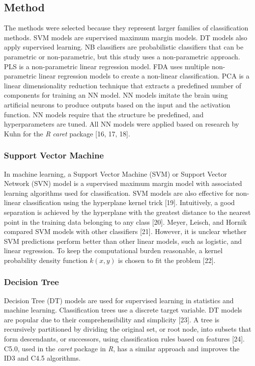 \let\LaTeXcline\cline\documentclass[sn-mathphys-num]{sn-jnl}\let\cline\LaTeXcline
\begin{document}
\subsection{Method}

The methods were selected because they represent larger families of classification methods. SVM models are supervised maximum margin models. DT models also apply supervised learning. NB classifiers are probabilistic classifiers that can be parametric or non-parametric, but this study uses a non-parametric approach. PLS is a non-parametric linear regression model. FDA uses multiple non-parametric linear regression models to create a non-linear classification. PCA is a linear dimensionality reduction technique that extracts a predefined number of components for training an NN model. NN models imitate the brain using artificial neurons to produce outputs based on the input and the activation function. NN models require that the structure be predefined, and hyperparameters are tuned. All NN models were applied based on research by Kuhn for the \textit{R} \textit{caret} package [16, 17, 18].

\subsubsection{Support Vector Machine}

In machine learning, a Support Vector Machine (SVM) or Support Vector Network (SVN) model is a supervised maximum margin model with associated learning algorithms used for classification. SVM models are also effective for non-linear classification using the hyperplane kernel trick [19]. Intuitively, a good separation is achieved by the hyperplane with the greatest distance to the nearest point in the training data belonging to any class [20]. Meyer, Leisch, and Hornik compared SVM models with other classifiers [21]. However, it is unclear whether SVM predictions perform better than other linear models, such as logistic, and linear regression. To keep the computational burden reasonable, a kernel probability density function $k(x, y)$ is chosen to fit the problem [22].

\subsubsection{Decision Tree}

Decision Tree (DT) models are used for supervised learning in statistics and machine learning. Classification trees use a discrete target variable. DT models are popular due to their comprehensibility and simplicity [23]. A tree is recursively partitioned by dividing the original set, or root node, into subsets that form descendants, or successors, using classification rules based on features [24]. C5.0, used in the \textit{caret} package in \textit{R}, has a similar approach and improves the ID3 and C4.5 algorithms.
\end{document}
